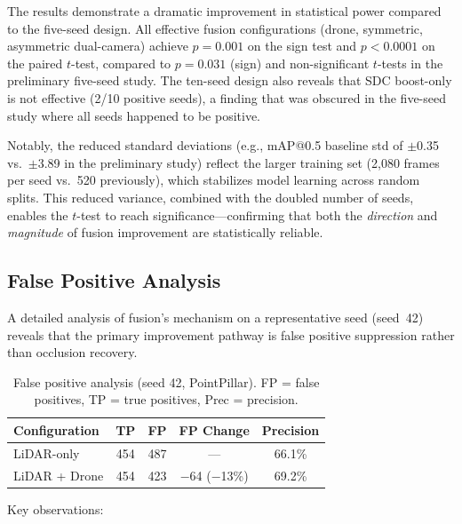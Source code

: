 \documentclass[sustainability,article,submit,moreauthors,pdftex]{Definitions/mdpi}
\begin{document}
The results demonstrate a dramatic improvement in statistical power compared to the five-seed design. All effective fusion configurations (drone, symmetric, asymmetric dual-camera) achieve $p = 0.001$ on the sign test and $p < 0.0001$ on the paired $t$-test, compared to $p = 0.031$ (sign) and non-significant $t$-tests in the preliminary five-seed study. The ten-seed design also reveals that SDC boost-only is not effective (2/10 positive seeds), a finding that was obscured in the five-seed study where all seeds happened to be positive.

Notably, the reduced standard deviations (e.g., mAP@0.5 baseline std of $\pm$0.35 vs.\ $\pm$3.89 in the preliminary study) reflect the larger training set (2{,}080 frames per seed vs.\ 520 previously), which stabilizes model learning across random splits. This reduced variance, combined with the doubled number of seeds, enables the $t$-test to reach significance---confirming that both the \emph{direction} and \emph{magnitude} of fusion improvement are statistically reliable.

\subsection{False Positive Analysis}\label{sec:fp_analysis}

A detailed analysis of fusion's mechanism on a representative seed (seed~42) reveals that the primary improvement pathway is false positive suppression rather than occlusion recovery.

\begin{table}[H]
\caption{False positive analysis (seed 42, PointPillar). FP = false positives, TP = true positives, Prec = precision.}\label{tab:fp_analysis}
\centering
\begin{tabular}{lcccc}
\toprule
\textbf{Configuration} & \textbf{TP} & \textbf{FP} & \textbf{FP Change} & \textbf{Precision} \\
\midrule
LiDAR-only   & 454 & 487 & ---       & 66.1\% \\
LiDAR + Drone & 454 & 423 & $-$64 ($-$13\%) & 69.2\% \\
\bottomrule
\end{tabular}
\end{table}

Key observations:
\end{document}
